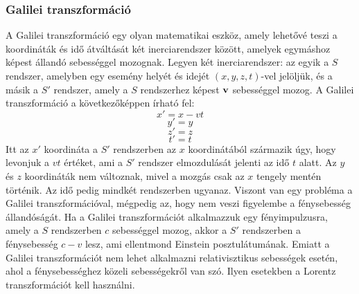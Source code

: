 \documentclass[../main.tex]{subfiles}
\begin{document}
\subsubsection{Galilei transzformáció}
    A Galilei transzformáció egy olyan matematikai eszköz, amely lehetővé teszi a koordináták és idő átváltását két inerciarendszer között, amelyek egymáshoz képest állandó sebességgel mozognak.
    Legyen két inerciarendszer: az egyik a $S$ rendszer, amelyben egy esemény helyét és idejét $(x, y, z, t)$-vel jelöljük, és a másik a $S'$ rendszer, amely a $S$ rendszerhez képest $\bold{v}$ sebességgel mozog.
    A Galilei transzformáció a következőképpen írható fel:
    \begin{equation}
        x' = x - vt
    \end{equation}
    \begin{equation}
        y' = y
    \end{equation}
    \begin{equation}
        z' = z
    \end{equation}
    \begin{equation}
        t' = t
    \end{equation}
    Itt az $x'$ koordináta a $S'$ rendszerben az $x$ koordinátából származik úgy, hogy levonjuk a $vt$ értéket, ami a $S'$ rendszer elmozdulását jelenti az idő $t$ alatt. Az $y$ és $z$ koordináták nem változnak,
    mivel a mozgás csak az $x$ tengely mentén történik. Az idő pedig mindkét rendszerben ugyanaz. Viszont van egy probléma a Galilei transzformációval, mégpedig az, hogy nem veszi figyelembe a fénysebesség állandóságát.
    Ha a Galilei transzformációt alkalmazzuk egy fényimpulzusra, amely a $S$ rendszerben $c$ sebességgel mozog, akkor a $S'$ rendszerben a fénysebesség $c - v$ lesz, ami ellentmond Einstein posztulátumának.
    Emiatt a Galilei transzformációt nem lehet alkalmazni relativisztikus sebességek esetén, ahol a fénysebességhez közeli sebességekről van szó. Ilyen esetekben a Lorentz transzformációt kell használni.
\end{document}
